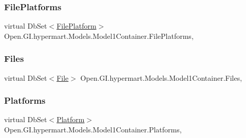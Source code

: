 \subsubsection{\texorpdfstring{File\+Platforms}{FilePlatforms}}
{\footnotesize\ttfamily virtual Db\+Set$<$\hyperlink{class_open_1_1_g_i_1_1hypermart_1_1_models_1_1_file_platform}{File\+Platform}$>$ Open.\+G\+I.\+hypermart.\+Models.\+Model1\+Container.\+File\+Platforms\hspace{0.3cm}{\ttfamily [get]}, {\ttfamily [set]}}

\hypertarget{class_open_1_1_g_i_1_1hypermart_1_1_models_1_1_model1_container_a446f391e8b281cf4e3e71f369940189c}{}\label{class_open_1_1_g_i_1_1hypermart_1_1_models_1_1_model1_container_a446f391e8b281cf4e3e71f369940189c} 
\subsubsection{\texorpdfstring{Files}{Files}}
{\footnotesize\ttfamily virtual Db\+Set$<$\hyperlink{class_open_1_1_g_i_1_1hypermart_1_1_models_1_1_file}{File}$>$ Open.\+G\+I.\+hypermart.\+Models.\+Model1\+Container.\+Files\hspace{0.3cm}{\ttfamily [get]}, {\ttfamily [set]}}

\hypertarget{class_open_1_1_g_i_1_1hypermart_1_1_models_1_1_model1_container_a47b249679414da9e63797516568ddb73}{}\label{class_open_1_1_g_i_1_1hypermart_1_1_models_1_1_model1_container_a47b249679414da9e63797516568ddb73} 
\subsubsection{\texorpdfstring{Platforms}{Platforms}}
{\footnotesize\ttfamily virtual Db\+Set$<$\hyperlink{class_open_1_1_g_i_1_1hypermart_1_1_models_1_1_platform}{Platform}$>$ Open.\+G\+I.\+hypermart.\+Models.\+Model1\+Container.\+Platforms\hspace{0.3cm}{\ttfamily [get]}, {\ttfamily [set]}}

